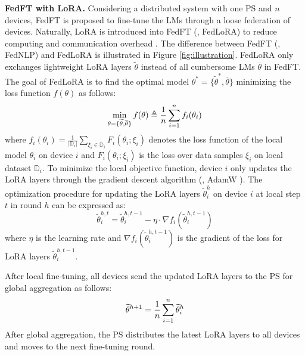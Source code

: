 \textbf{FedFT with LoRA.}
Considering a distributed system with one PS and $n$ devices, FedFT is proposed to fine-tune the LMs through a loose federation of devices. %
Naturally, LoRA is introduced into FedFT (\eg, FedLoRA) to reduce computing and communication overhead \cite{zhang2023fedpetuning, cho2023heterogeneous}.
The difference between FedFT (\eg, FedNLP) and FedLoRA is illustrated in Figure \ref{fig:illustration}.
FedLoRA only exchanges lightweight LoRA layers $\widetilde{\theta}$ instead of all cumbersome LMs $\overline{\theta}$ in FedFT.
The goal of FedLoRA is to find the optimal model $\theta^* = \{ \widetilde{\theta}^*, \overline{\theta} \}$ minimizing the loss function $f(\theta)$ as follows:
\vspace{-0.2cm}
\begin{equation}
    \min_{\theta = \{ \widetilde{\theta}, \overline{\theta} \}} f(\theta) \triangleq \frac{1}{n} \sum_{i = 1}^{n} f_i(\theta_i)
    \vspace{-0.2cm}
\end{equation}
where $f_i(\theta_i) = \frac{1}{|\mathbb{D}_i|} \sum_{\xi_i \in \mathbb{D}_i} F_i(\theta_i; \xi_i)$ denotes the loss function of the local model $\theta_i$ on device $i$ and $F_i(\theta_i; \xi_i)$ is the loss over data samples $\xi_i$ on local dataset $\mathbb{D}_i$. 
To minimize the local objective function, device $i$ only updates the LoRA layers through the gradient descent algorithm (\eg, AdamW \cite{loshchilov2017decoupled}).
The optimization procedure for updating the LoRA layers $\widetilde{\theta}_i^{h}$ on device $i$ at local step $t$ in round $h$ can be expressed as: 
\begin{equation}
    \widetilde{\theta}_i^{h,t} = \widetilde{\theta}_i^{h,t - 1} - \eta \cdot \nabla f_i(\widetilde{\theta}_i^{h, t - 1})
\end{equation}
where $\eta$ is the learning rate and $\nabla f_i(\widetilde{\theta}_i^{h, t - 1})$ is the gradient of the loss for LoRA layers $\widetilde{\theta}_i^{h, t - 1}$.

After local fine-tuning, all devices send the updated LoRA layers to the PS for global aggregation as follows: 
\vspace{-0.1cm}
\begin{equation}
    \widetilde{\theta}^{h+1} = \frac{1}{n} \sum_{i=1}^{n} \widetilde{\theta}_i^h
    \vspace{-0.1cm}
\end{equation}
After global aggregation, the PS distributes the latest LoRA layers to all devices and moves to the next fine-tuning round.
\vspace{-0.3cm}

